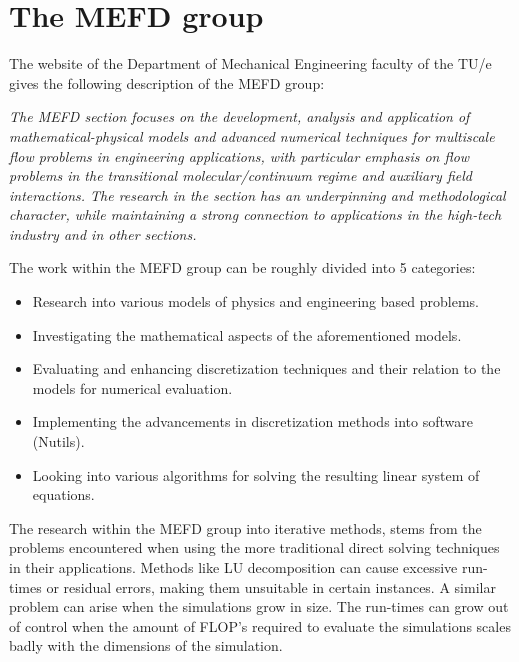 \newpage

\section{The MEFD group}

\hspace{5mm}The website of the Department of Mechanical Engineering faculty of the TU/e gives the following description of the MEFD group:\vspace{4mm}

\textit{The MEFD section focuses on the development, analysis and application of mathematical-physical models and advanced numerical techniques for multiscale flow problems in engineering applications, with particular emphasis on flow problems in the transitional molecular/continuum regime and auxiliary field interactions. The research in the section has an underpinning and methodological character, while maintaining a strong connection to applications in the high-tech industry and in other sections.} \autocite[]{tue_mefd_1}\vspace{4mm}

\noindent The work within the MEFD group can be roughly divided into 5 categories:

\begin{itemize}
    \item Research into various models of physics and engineering based problems.
    \item Investigating the mathematical aspects of the aforementioned models.
    \item Evaluating and enhancing discretization techniques and their relation to the models for numerical evaluation.
    \item Implementing the advancements in discretization methods into software (Nutils).
    \item Looking into various algorithms for solving the resulting linear system of equations.
\end{itemize}

The research within the MEFD group into iterative methods, stems from the problems encountered when using the more traditional direct solving techniques in their applications. Methods like LU decomposition can cause excessive run-times or residual errors, making them unsuitable in certain instances. A similar problem can arise when the simulations grow in size. The run-times can grow out of control when the amount of FLOP's required to evaluate the simulations scales badly with the dimensions of the simulation.\vspace{4mm}

